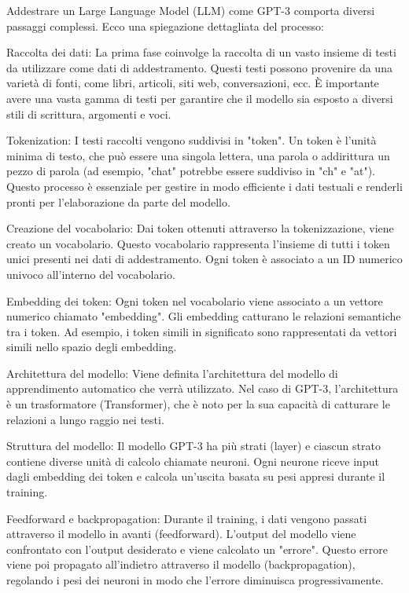 Addestrare un Large Language Model (LLM) come GPT-3 comporta diversi passaggi complessi. Ecco una spiegazione dettagliata del processo:

Raccolta dei dati: La prima fase coinvolge la raccolta di un vasto insieme di testi da utilizzare come dati di addestramento. Questi testi possono provenire da una varietà di fonti, come libri, articoli, siti web, conversazioni, ecc. È importante avere una vasta gamma di testi per garantire che il modello sia esposto a diversi stili di scrittura, argomenti e voci.

Tokenization: I testi raccolti vengono suddivisi in "token". Un token è l'unità minima di testo, che può essere una singola lettera, una parola o addirittura un pezzo di parola (ad esempio, "chat" potrebbe essere suddiviso in "ch" e "at"). Questo processo è essenziale per gestire in modo efficiente i dati testuali e renderli pronti per l'elaborazione da parte del modello.

Creazione del vocabolario: Dai token ottenuti attraverso la tokenizzazione, viene creato un vocabolario. Questo vocabolario rappresenta l'insieme di tutti i token unici presenti nei dati di addestramento. Ogni token è associato a un ID numerico univoco all'interno del vocabolario.

Embedding dei token: Ogni token nel vocabolario viene associato a un vettore numerico chiamato "embedding". Gli embedding catturano le relazioni semantiche tra i token. Ad esempio, i token simili in significato sono rappresentati da vettori simili nello spazio degli embedding.

Architettura del modello: Viene definita l'architettura del modello di apprendimento automatico che verrà utilizzato. Nel caso di GPT-3, l'architettura è un trasformatore (Transformer), che è noto per la sua capacità di catturare le relazioni a lungo raggio nei testi.

Struttura del modello: Il modello GPT-3 ha più strati (layer) e ciascun strato contiene diverse unità di calcolo chiamate neuroni. Ogni neurone riceve input dagli embedding dei token e calcola un'uscita basata su pesi appresi durante il training.

Feedforward e backpropagation: Durante il training, i dati vengono passati attraverso il modello in avanti (feedforward). L'output del modello viene confrontato con l'output desiderato e viene calcolato un "errore". Questo errore viene poi propagato all'indietro attraverso il modello (backpropagation), regolando i pesi dei neuroni in modo che l'errore diminuisca progressivamente.

